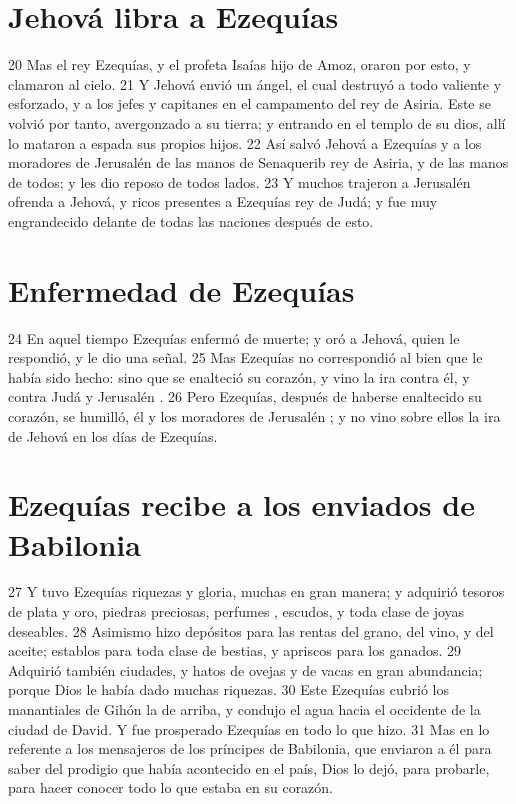 \section*{Jehová libra a Ezequías }

 
20 Mas el rey Ezequías, y el profeta Isaías hijo de Amoz, oraron por esto, y clamaron al cielo.
21 Y Jehová envió un ángel, el cual destruyó a todo valiente y esforzado, y a los jefes y capitanes en el campamento del rey de Asiria. Este se volvió por tanto, avergonzado a su tierra; y entrando en el templo de su dios, allí lo mataron a espada sus propios hijos.
22 Así salvó Jehová a Ezequías y a los moradores de Jerusalén  de las manos de Senaquerib rey de Asiria, y de las manos de todos; y les dio reposo de todos lados.
23 Y muchos trajeron a Jerusalén ofrenda a Jehová, y ricos presentes a Ezequías rey de Judá; y fue muy engrandecido delante de todas las naciones después de esto.
\section*{Enfermedad de Ezequías }

 
24 En aquel tiempo Ezequías enfermó de muerte; y oró a Jehová, quien le respondió, y le dio una señal.
25 Mas Ezequías no correspondió al bien que le había sido hecho: sino que se enalteció su corazón, y vino la ira contra él, y contra Judá y Jerusalén .
26 Pero Ezequías, después de haberse enaltecido su corazón, se humilló, él y los moradores de Jerusalén ; y no vino sobre ellos la ira de Jehová en los días de Ezequías.
\section*{Ezequías recibe a los enviados de Babilonia }


27 Y tuvo Ezequías riquezas y gloria, muchas en gran manera; y adquirió tesoros de plata y oro, piedras preciosas, perfumes , escudos, y toda clase de joyas deseables.
28 Asimismo hizo depósitos para las rentas del grano, del vino, y del aceite; establos para toda clase de bestias, y apriscos para los ganados. 
29 Adquirió también ciudades, y hatos de ovejas y de vacas en gran abundancia; porque Dios le había dado muchas riquezas.
30 Este Ezequías cubrió los manantiales de Gihón la de arriba, y condujo el agua hacia el occidente de la ciudad de David. Y fue prosperado Ezequías en todo lo que hizo.
31 Mas en lo referente a los mensajeros de los príncipes de Babilonia, que enviaron a él para saber del prodigio que había acontecido en el país, Dios lo dejó, para probarle, para hacer conocer todo lo que estaba en su corazón.
